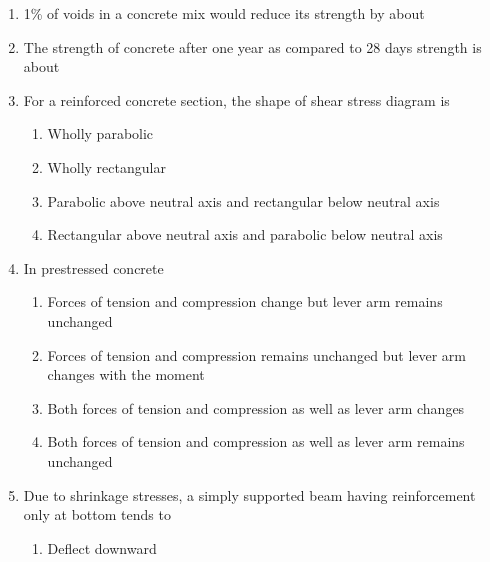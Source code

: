 \documentclass[11pt,a4paper]{article}
\begin{document}
\begin{enumerate}
\item{1\% of voids in a concrete mix would reduce its strength by about}
\\
\item{The strength of concrete after one year as compared to 28 days strength is about}
\\
\item{For a reinforced concrete section, the shape of shear stress diagram is}
\begin{enumerate}[label=\Alph*.]
\item{Wholly parabolic}
\item{Wholly rectangular}
\item{Parabolic above neutral axis and rectangular below neutral axis}
\item{Rectangular above neutral axis and parabolic below neutral axis}
\end{enumerate}
\item{In prestressed concrete}
\begin{enumerate}[label=\Alph*.]
\item{Forces of tension and compression change but lever arm remains unchanged}
\item{Forces of tension and compression remains unchanged but lever arm changes with the moment}
\item{Both forces of tension and compression as well as lever arm changes}
\item{Both forces of tension and compression as well as lever arm remains unchanged}
\end{enumerate}
\item{Due to shrinkage stresses, a simply supported beam having reinforcement only at bottom tends to}
\begin{enumerate}[label=\Alph*.]
\item{Deflect downward}

\end{enumerate}
\end{enumerate}
\end{document}
